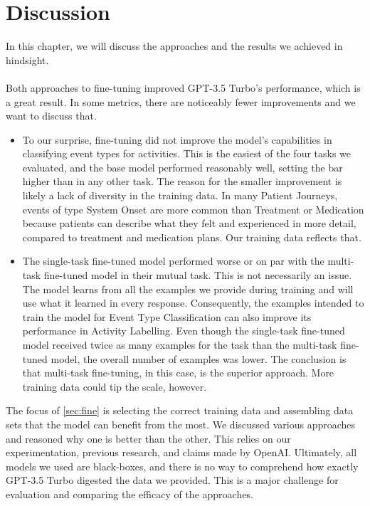 \section{Discussion}\label{sec:discussion}
In this chapter, we will discuss the approaches and the results we achieved in hindsight.\\\\
Both approaches to fine-tuning improved GPT-3.5 Turbo's performance, which is a great result. In some metrics, there are noticeably fewer improvements and we want to discuss that.\\
\begin{itemize}
    \item To our surprise, fine-tuning did not improve the model's capabilities in classifying event types for activities. This is the easiest of the four tasks we evaluated, and the base model performed reasonably well, setting the bar higher than in any other task. The reason for the smaller improvement is likely a lack of diversity in the training data. In many Patient Journeys, events of type System Onset are more common than Treatment or Medication because patients can describe what they felt and experienced in more detail, compared to treatment and medication plans. Our training data reflects that.
    \item The single-task fine-tuned model performed worse or on par with the multi-task fine-tuned model in their mutual task. This is not necessarily an issue. The model learns from all the examples we provide during training and will use what it learned in every response. Consequently, the examples intended to train the model for Event Type Classification can also improve its performance in Activity Labelling. Even though the single-task fine-tuned model received twice as many examples for the task  than the multi-task fine-tuned model, the overall number of examples was lower. The conclusion is that multi-task fine-tuning, in this case, is the superior approach. More training data could tip the scale, however.
\end{itemize}
The focus of \autoref{sec:fine} is selecting the correct training data and assembling data sets that the model can benefit from the most. We discussed various approaches and reasoned why one is better than the other. This relies on our experimentation, previous research, and claims made by OpenAI. Ultimately, all models we used are black-boxes, and there is no way to comprehend how exactly GPT-3.5 Turbo digested the data we provided. This is a major challenge for evaluation and comparing the efficacy  of the approaches.